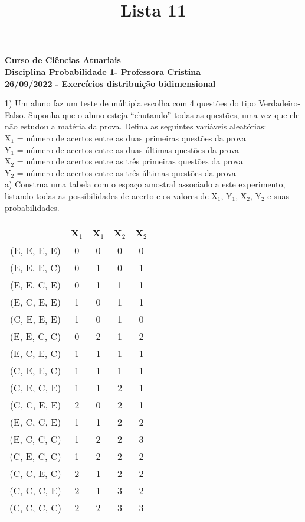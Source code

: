 \documentclass[12pt,a4paper,draft]{article}
\title{Lista 11}
\date{}
\begin{document}
	\maketitle
	\begin{center}
		\textbf{Curso de Ciências Atuariais}\\
		\textbf{Disciplina Probabilidade 1- Professora Cristina}\\
		\textbf{26/09/2022 - Exercícios distribuição bidimensional}
	\end{center}
	1) Um aluno faz um teste de múltipla escolha com 4 questões do tipo Verdadeiro-Falso. Suponha que o aluno esteja “chutando” todas as questões, uma vez que ele não estudou a matéria da prova. Defina as seguintes variáveis aleatórias:\\
	X$_{1}$ = número de acertos entre as duas primeiras questões da prova\\
	Y$_{1}$ = número de acertos entre as duas últimas questões da prova\\
	X$_{2}$ = número de acertos entre as três primeiras questões da prova\\
	Y$_{2}$ = número de acertos entre as três últimas questões da prova\\
	a) Construa uma tabela com o espaço amostral associado a este experimento, listando todas as possibilidades de acerto e os valores de X$_{1}$, Y$_{1}$, X$_{2}$, Y$_{2}$ e suas probabilidades.
	\vspace{1cm}\\
	\begin{center}
		\begin{tabular}{ccccc}\midrule
			 & X$_{1}$ & X$_{1}$ & X$_{2}$ & X$_{2}$\\ \midrule
			(E, E, E, E) & 0 & 0 & 0 & 0\\ \midrule
			(E, E, E, C) & 0 & 1 & 0 & 1\\ \midrule
			(E, E, C, E) & 0 & 1 & 1 & 1\\ \midrule
			(E, C, E, E) & 1 & 0 & 1 & 1\\ \midrule
			(C, E, E, E) & 1 & 0 & 1 & 0\\ \midrule
			(E, E, C, C) & 0 & 2 & 1 & 2\\ \midrule
			(E, C, E, C) & 1 & 1 & 1 & 1\\ \midrule
			(C, E, E, C) & 1 & 1 & 1 & 1\\ \midrule
			(C, E, C, E) & 1 & 1 & 2 & 1\\ \midrule
			(C, C, E, E) & 2 & 0 & 2 & 1\\ \midrule
			(E, C, C, E) & 1 & 1 & 2 & 2\\ \midrule
			(E, C, C, C) & 1 & 2 & 2 & 3\\ \midrule
			(C, E, C, C) & 1 & 2 & 2 & 2\\ \midrule
			(C, C, E, C) & 2 & 1 & 2 & 2\\ \midrule
			(C, C, C, E) & 2 & 1 & 3 & 2\\ \midrule
			(C, C, C, C) & 2 & 2 & 3 & 3\\ \midrule
		\end{tabular}
	\end{center}
\end{document}
